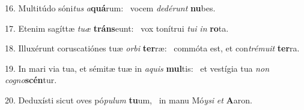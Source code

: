 16. Multitúdo sóni\textit{tus} \textit{a}\textbf{quá}rum: \ast\  vocem \textit{de}\textit{dé}\textit{runt} \textbf{nu}bes.\

17. Etenim sagíttæ \textit{tu}\textit{æ} \textbf{tráns}eunt: \ast\  vox tonítrui \textit{tu}\textit{i} \textit{in} \textbf{ro}ta.\

18. Illuxérunt coruscatiónes tuæ \textit{or}\textit{bi} \textbf{ter}ræ: \ast\  commóta est, et con\textit{tré}\textit{mu}\textit{it} \textbf{ter}ra.\

19. In mari via tua, et sémitæ tuæ in \textit{a}\textit{quis} \textbf{mul}tis: \ast\  et vestígia tua \textit{non} \textit{co}\textit{gno}\textbf{scén}tur.\

20. Deduxísti sicut oves pó\textit{pu}\textit{lum} \textbf{tu}um, \ast\  in manu Mó\textit{y}\textit{si} \textit{et} \textbf{A}aron.\

